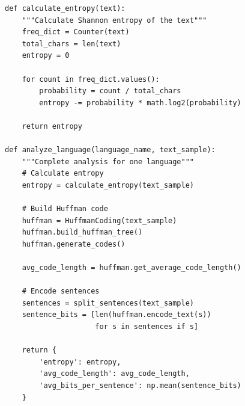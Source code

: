 \documentclass[11pt]{article}
\begin{document}
\begin{lstlisting}
def calculate_entropy(text):
    """Calculate Shannon entropy of the text"""
    freq_dict = Counter(text)
    total_chars = len(text)
    entropy = 0
    
    for count in freq_dict.values():
        probability = count / total_chars
        entropy -= probability * math.log2(probability)
    
    return entropy

def analyze_language(language_name, text_sample):
    """Complete analysis for one language"""
    # Calculate entropy
    entropy = calculate_entropy(text_sample)
    
    # Build Huffman code
    huffman = HuffmanCoding(text_sample)
    huffman.build_huffman_tree()
    huffman.generate_codes()
    
    avg_code_length = huffman.get_average_code_length()
    
    # Encode sentences
    sentences = split_sentences(text_sample)
    sentence_bits = [len(huffman.encode_text(s)) 
                     for s in sentences if s]
    
    return {
        'entropy': entropy,
        'avg_code_length': avg_code_length,
        'avg_bits_per_sentence': np.mean(sentence_bits)
    }
\end{lstlisting}
\end{document}
